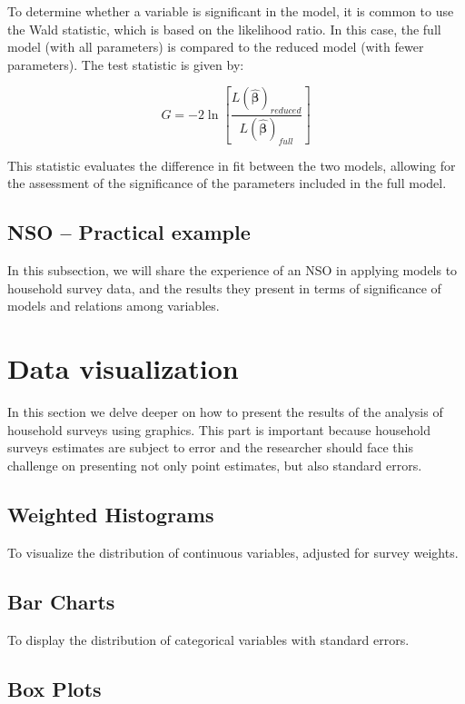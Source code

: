 \documentclass[
  12pt,
]{book}
\begin{document}
To determine whether a variable is significant in the model, it is common to use the Wald statistic, which is based on the likelihood ratio. In this case, the full model (with all parameters) is compared to the reduced model (with fewer parameters). The test statistic is given by:

\[
G=-2\ln\left[\frac{L\left(\hat{\boldsymbol{\beta}}\right)_{reduced}}{L\left(\hat{\boldsymbol{\beta}}\right)_{full}}\right]
\]

This statistic evaluates the difference in fit between the two models, allowing for the assessment of the significance of the parameters included in the full model.

\section{NSO -- Practical example}\label{nso-practical-example-2}

In this subsection, we will share the experience of an NSO in applying models to household survey data, and the results they present in terms of significance of models and relations among variables.

\chapter{Data visualization}\label{data-visualization}

In this section we delve deeper on how to present the results of the analysis of household surveys using graphics. This part is important because household surveys estimates are subject to error and the researcher should face this challenge on presenting not only point estimates, but also standard errors.

\section{Weighted Histograms}\label{weighted-histograms}

To visualize the distribution of continuous variables, adjusted for survey weights.

\section{Bar Charts}\label{bar-charts}

To display the distribution of categorical variables with standard errors.

\section{Box Plots}\label{box-plots}
\end{document}
